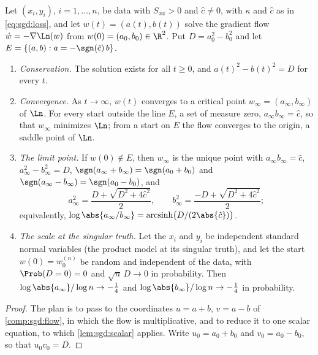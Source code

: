 \begin{refsection}
\begin{theorem}\label{thm:sgd:balance}
Let $(x_i,y_i)$, $i=1,\dots,n$, be data with $S_{xx}>0$ and $\hat c\ne0$, with $\kappa$ and $\hat c$ as in \eqref{eq:sgd:loss}, and let $w(t)=(a(t),b(t))$ solve the gradient flow $\dot w=-\nabla\Ln(w)$ from $w(0)=(a_0,b_0)\in\R^2$. Put $D=a_0^2-b_0^2$ and let $E=\{(a,b):a=-\sgn(\hat c)\,b\}$.
\begin{enumerate}[label=(\roman*)]
\item \emph{Conservation.} The solution exists for all $t\ge0$, and $a(t)^2-b(t)^2=D$ for every $t$.
\item \emph{Convergence.} As $t\to\infty$, $w(t)$ converges to a critical point $w_\infty=(a_\infty,b_\infty)$ of $\Ln$. For every start outside the line $E$, a set of measure zero, $a_\infty b_\infty=\hat c$, so that $w_\infty$ minimizes $\Ln$; from a start on $E$ the flow converges to the origin, a saddle point of $\Ln$.
\item \emph{The limit point.} If $w(0)\notin E$, then $w_\infty$ is the unique point with $a_\infty b_\infty=\hat c$, $a_\infty^2-b_\infty^2=D$, $\sgn(a_\infty+b_\infty)=\sgn(a_0+b_0)$ and $\sgn(a_\infty-b_\infty)=\sgn(a_0-b_0)$, and
\begin{equation}\label{eq:sgd:limit}
a_\infty^2=\frac{D+\sqrt{D^2+4\hat c^2}}2,\qquad b_\infty^2=\frac{-D+\sqrt{D^2+4\hat c^2}}2;
\end{equation}
equivalently, $\log\abs{a_\infty/b_\infty}=\sgdasinh\bigl(D/(2\abs{\hat c})\bigr)$.
\item \emph{The scale at the singular truth.} Let the $x_i$ and $y_i$ be independent standard normal variables (the product model at its singular truth), and let the start $w(0)=w_0^{(n)}$ be random and independent of the data, with $\Prob(D=0)=0$ and $\sqrt n\,D\to0$ in probability. Then $\log\abs{a_\infty}/\log n\to-\frac14$ and $\log\abs{b_\infty}/\log n\to-\frac14$ in probability.
\end{enumerate}
\end{theorem}

\begin{proof}
The plan is to pass to the coordinates $u=a+b$, $v=a-b$ of \cref{comp:sgd:flow}, in which the flow is multiplicative, and to reduce it to one scalar equation, to which \cref{lem:sgd:scalar} applies. Write $u_0=a_0+b_0$ and $v_0=a_0-b_0$, so that $u_0v_0=D$.


\end{proof}
\end{refsection}
